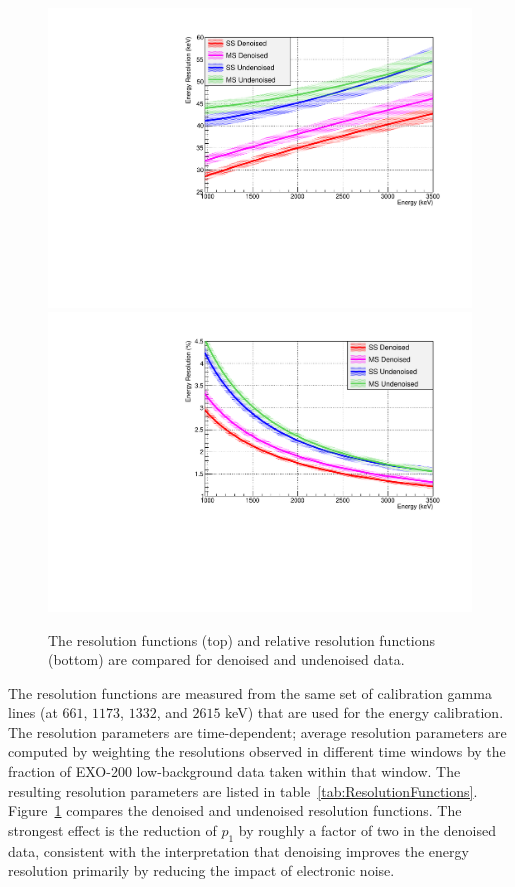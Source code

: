\begin{figure}
\begin{center}
\includegraphics[keepaspectratio=true,width=.95\textwidth]{ResolutionFunctionComparison_absolute.pdf}
\includegraphics[keepaspectratio=true,width=.95\textwidth]{ResolutionFunctionComparison_relative.pdf}
\end{center}
\renewcommand{\baselinestretch}{1}
\small\normalsize
\begin{quote}
\caption{The resolution functions (top) and relative resolution functions (bottom) are compared for denoised and undenoised data.}
\label{fig:ResolutionFunctionComparison}
\end{quote}
\end{figure}
\renewcommand{\baselinestretch}{2}
\small\normalsize

The resolution functions are measured from the same set of calibration gamma lines (at $661$, $1173$, $1332$, and $2615$ keV) that are used for the energy calibration.  The resolution parameters are time-dependent; average resolution parameters are computed by weighting the resolutions observed in different time windows by the fraction of EXO-200 low-background data taken within that window.  The resulting resolution parameters are listed in table~\ref{tab:ResolutionFunctions}.  Figure~\ref{fig:ResolutionFunctionComparison} compares the denoised and undenoised resolution functions.  The strongest effect is the reduction of $p_1$ by roughly a factor of two in the denoised data, consistent with the interpretation that denoising improves the energy resolution primarily by reducing the impact of electronic noise.

